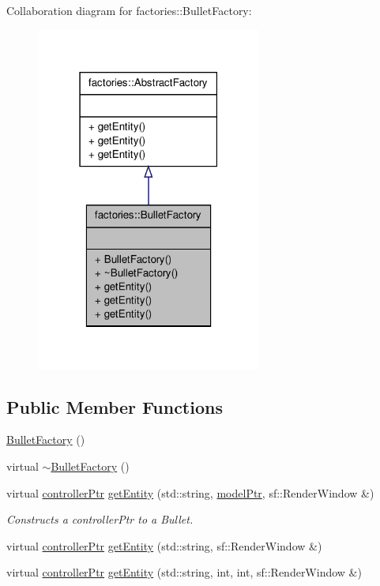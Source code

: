 \-Collaboration diagram for factories\-:\-:\-Bullet\-Factory\-:
\nopagebreak
\begin{figure}[H]
\begin{center}
\leavevmode
\includegraphics[width=210pt]{da/ddc/classfactories_1_1BulletFactory__coll__graph}
\end{center}
\end{figure}
\subsection*{\-Public \-Member \-Functions}
\begin{DoxyCompactItemize}
\item 
\hyperlink{classfactories_1_1BulletFactory_a5af74b507fc4f0fe39fb94efbf159a5c}{\-Bullet\-Factory} ()
\item 
virtual \hyperlink{classfactories_1_1BulletFactory_a789745f38774d8a97593881eb3f42405}{$\sim$\-Bullet\-Factory} ()
\item 
virtual \hyperlink{Game_8h_a21b04f6cf2d5990b82725fac5ea2ce9a}{controller\-Ptr} \hyperlink{classfactories_1_1BulletFactory_a52d80d4c23a55808219029ae7ad898a4}{get\-Entity} (std\-::string, \hyperlink{ModelView_8h_a78966ddb517fca8d2b29a2bc5c31e74e}{model\-Ptr}, sf\-::\-Render\-Window \&)
\begin{DoxyCompactList}\small\item\em \-Constructs a controller\-Ptr to a \-Bullet. \end{DoxyCompactList}\item 
virtual \hyperlink{Game_8h_a21b04f6cf2d5990b82725fac5ea2ce9a}{controller\-Ptr} \hyperlink{classfactories_1_1BulletFactory_ab04bbad8513b1ddb8045c89885a2fa8e}{get\-Entity} (std\-::string, sf\-::\-Render\-Window \&)
\item 
virtual \hyperlink{Game_8h_a21b04f6cf2d5990b82725fac5ea2ce9a}{controller\-Ptr} \hyperlink{classfactories_1_1BulletFactory_a1e8e14ec9380341eb3522d60fdaf659e}{get\-Entity} (std\-::string, int, int, sf\-::\-Render\-Window \&)
\end{DoxyCompactItemize}


